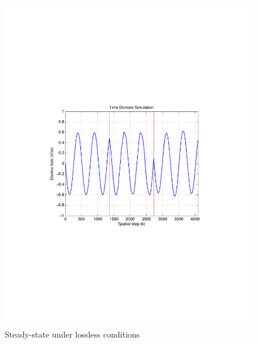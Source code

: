 \documentclass{article}
\begin{document}
\begin{figure}[t!]
\centering
\includegraphics[scale=0.55, trim=3.5cm 8.7cm 4.5cm 8.75cm, clip]{Figures/FigCh03_1DDNGSteadyStateLossless.pdf}
\caption{Steady-state under lossless conditions}
\label{1DDNG-SteadyState-Lossless}
\end{figure}
\end{document}
